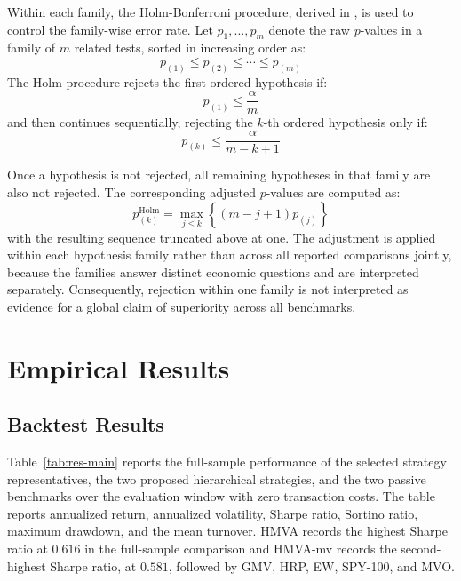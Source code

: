 \documentclass[12pt]{article}
\begin{document}
Within each family, the Holm-Bonferroni procedure, derived in \cite{holm1979}, is used to control the family-wise error rate. Let $p_1,\dots,p_m$ denote the raw $p$-values in a family of $m$ related tests, sorted in increasing order as:
\begin{equation}
p_{(1)}\le p_{(2)}\le \cdots \le p_{(m)}
\end{equation}
The Holm procedure rejects the first ordered hypothesis if:
\begin{equation}
p_{(1)} \le \frac{\alpha}{m}
\end{equation}
and then continues sequentially, rejecting the $k$-th ordered hypothesis only if:
\begin{equation}
p_{(k)} \le \frac{\alpha}{m-k+1}
\label{eq:holm-critical}
\end{equation}

Once a hypothesis is not rejected, all remaining hypotheses in that family are also not rejected.
The corresponding adjusted $p$-values are computed as:
\begin{equation}
p^{\mathrm{Holm}}_{(k)}
=
\max_{j\le k}
\left\{
(m-j+1)p_{(j)}
\right\}
\label{eq:holm-adj}
\end{equation}
with the resulting sequence truncated above at one. The adjustment is applied within each hypothesis family rather than across all reported comparisons jointly, because the families answer distinct economic questions and are interpreted separately. Consequently, rejection within one family is not interpreted as evidence for a global claim of superiority across all benchmarks.


\section{Empirical Results}
\label{sec:empirical-results}

\subsection{Backtest Results}
\label{sec:res-full}

Table~\ref{tab:res-main} reports the full-sample performance of the selected strategy representatives, the two proposed hierarchical strategies, and the two passive benchmarks over the evaluation window with zero transaction costs. The table reports annualized return, annualized volatility, Sharpe ratio, Sortino ratio, maximum drawdown, and the mean turnover. HMVA records the highest Sharpe ratio at $0.616$ in the full-sample comparison and HMVA-mv records the second-highest Sharpe ratio, at $0.581$, followed by GMV, HRP, EW, SPY-100, and MVO.
\end{document}
